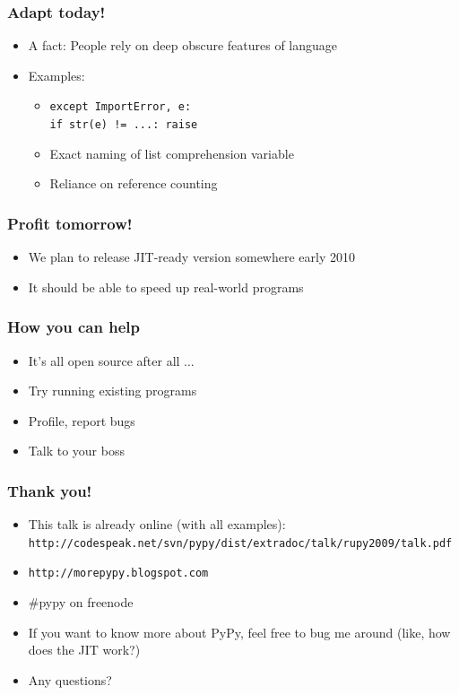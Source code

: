 \documentclass[utf8x]{beamer}
\begin{document}
\begin{frame}
  \frametitle{Adapt today!}
  \begin{itemize}
    \item A fact: People rely on deep obscure features of language
    \item Examples:
      \pause
      \begin{itemize}
        \item {\tt except ImportError, e: \\ \quad if str(e) != ...:
          raise}
          \pause
        \item Exact naming of list comprehension variable
          \pause
        \item Reliance on reference counting
      \end{itemize}
  \end{itemize}
\end{frame}

\begin{frame}
  \frametitle{Profit tomorrow!}
  \begin{itemize}
    \item We plan to release JIT-ready version somewhere early 2010
      \pause
    \item It should be able to speed up real-world programs
  \end{itemize}
\end{frame}

\begin{frame}
  \frametitle{How you can help}
  \begin{itemize}
    \item It's all open source after all ...
    \item Try running existing programs
    \item Profile, report bugs
      \pause
    \item Talk to your boss
  \end{itemize}
\end{frame}

\begin{frame}
  \frametitle{Thank you!}
  \begin{itemize}
    \item This talk is already online (with all examples):
      {\tt http://codespeak.net/svn/pypy/dist/extradoc/talk/rupy2009/talk.pdf}
    \item {\tt http://morepypy.blogspot.com}
    \item \#pypy on freenode
    \item If you want to know more about PyPy, feel free to bug me
      around (like, how does the JIT work?)
    \item Any questions?
  \end{itemize}
\end{frame}
\end{document}
